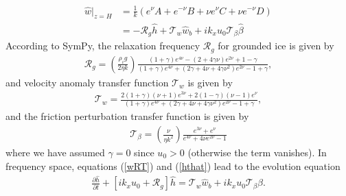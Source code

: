 \documentclass[paper=a4, fontsize=11pt]{article}
\begin{document}
\begin{align}
\hat{w}|_{z=H} &= \frac{1}{k}\left(e^{\nu} A + { e^{-\nu}}B + \nu e^{\nu} C + {\nu}{ e^{-\nu}} D\right) \\
&= -\mathcal{R}_g\hat{h} + \mathcal{T}_w\hat{w}_b  +ik_x u_0  \mathcal{T}_{\beta}  \hat{\beta}\label{wRT}
\end{align}
According to SymPy, the relaxation frequency $\mathcal{R}_g$ for grounded ice is given by
\begin{align}
\mathcal{R}_g = \left(\frac{\rho_i g }{2\eta k}\right)\frac{ (1+\gamma)e^{4\nu} -(2+4\gamma\nu)e^{2\nu} +1-\gamma  }{ (1+\gamma)e^{4\nu} + (2\gamma+4\nu+4\gamma\nu^2)e^{2\nu} -1 + \gamma  },
\end{align}
and velocity anomaly transfer function $\mathcal{T}_w$ is given by
\begin{align}
\mathcal{T}_w = \frac{2(1+\gamma)(\nu+1)e^{3\nu}+2(1-\gamma)(\nu-1)e^{\nu}  }{(1+\gamma)e^{4\nu} + (2\gamma+4\nu+4\gamma\nu^2)e^{2\nu} -1 + \gamma },
\end{align}
and the friction perturbation transfer function is given by
\begin{align}
\mathcal{T}_{\beta} =  \left(\frac{\nu}{\eta k^2}\right) \frac{e^{3\nu} + e^{\nu}}{e^{4\nu} +4\nu e^{2\nu} -1 }
\end{align}
where we have assumed $\gamma=0$  since $u_0>0$ (otherwise the term vanishes).
In frequency space,
equations (\ref{wRT}) and (\ref{hthat}) lead to the evolution equation
\begin{align}
\frac{\partial \hat{h}}{\partial t}+ \left[ik_xu_0  + \mathcal{R}_g\right]\hat{h} = \mathcal{T}_w\hat{w}_b+ik_xu_0\mathcal{T}_{\beta} \hat{\beta}. \label{dhhat}
\end{align}
\end{document}
